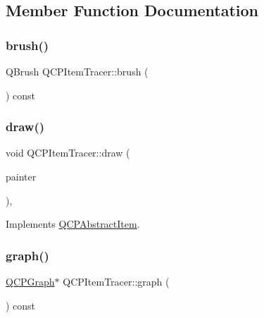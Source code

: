 \subsection{Member Function Documentation}
\mbox{\label{class_q_c_p_item_tracer_a6dd4660e70f58bb00390bcda56be568d}} 
\subsubsection{\texorpdfstring{brush()}{brush()}}
{\footnotesize\ttfamily Q\+Brush Q\+C\+P\+Item\+Tracer\+::brush (\begin{DoxyParamCaption}{ }\end{DoxyParamCaption}) const\hspace{0.3cm}{\ttfamily [inline]}}

\mbox{\label{class_q_c_p_item_tracer_a11f187ffea436434f3b5cfc387811967}} 
\subsubsection{\texorpdfstring{draw()}{draw()}}
{\footnotesize\ttfamily void Q\+C\+P\+Item\+Tracer\+::draw (\begin{DoxyParamCaption}\item[{\hyperlink{class_q_c_p_painter}{Q\+C\+P\+Painter} $\ast$}]{painter }\end{DoxyParamCaption})\hspace{0.3cm}{\ttfamily [protected]}, {\ttfamily [virtual]}}



Implements \hyperlink{class_q_c_p_abstract_item_a007fdab79c935a5da5aa04a21d268c18}{Q\+C\+P\+Abstract\+Item}.

\mbox{\label{class_q_c_p_item_tracer_ac6526e3e1fff79894f034823461b138a}} 
\subsubsection{\texorpdfstring{graph()}{graph()}}
{\footnotesize\ttfamily \hyperlink{class_q_c_p_graph}{Q\+C\+P\+Graph}$\ast$ Q\+C\+P\+Item\+Tracer\+::graph (\begin{DoxyParamCaption}{ }\end{DoxyParamCaption}) const\hspace{0.3cm}{\ttfamily [inline]}}

